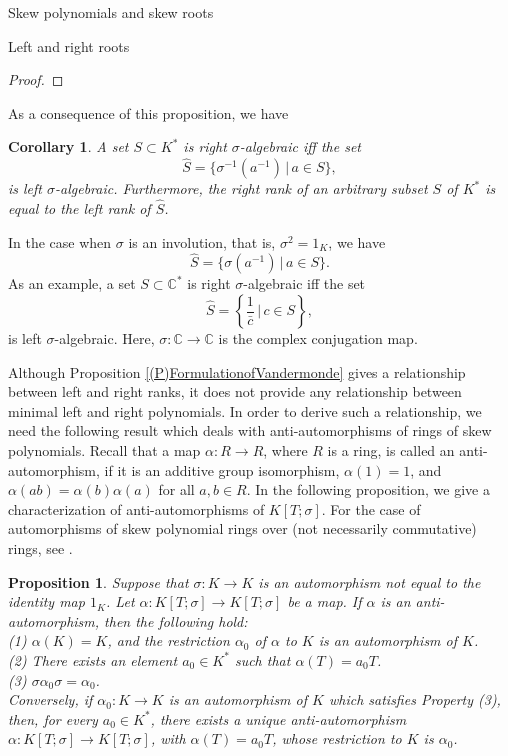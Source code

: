 \documentclass[11pt,a4paper]{article}
\theoremstyle{theorem}
\newtheorem{corollary}[theorem]{Corollary}
\newtheorem{proposition}[theorem]{Proposition}
\numberwithin{equation}{section}
\newcommand{\s}{\sigma}
\begin{document}
\begin{section}{Skew polynomials and skew roots}
\begin{subsection}{Left and right roots}
\begin{proof}
	\end{proof}
	 As a consequence of this proposition, we have
	 \begin{corollary}
	 	A set $S\subset K^*$ is right $\s$-algebraic iff the set 
	 	$$\widehat{S}=\{\s^{-1}(a^{-1})\, |\, a\in S\},$$
	 	is left $\s$-algebraic. Furthermore, the right rank of an arbitrary subset $S$ of $K^*$  is equal to the left rank of $\widehat{S}$. 
	 \end{corollary}
	In the case when $\s$ is an involution, that is, $\s^2=1_K$, we have
	$$\widehat{S}=\{\s(a^{-1})\, |\, a\in S\}.$$
	As an example, a set $S\subset \mathbb{C}^*$ is right $\s$-algebraic iff the set 
	$$\widehat{S}=\left\lbrace \frac{1}{\bar{c}}\, |\, c\in S\right\rbrace ,$$
	is left $\s$-algebraic. Here, $\s:\mathbb{C}\to \mathbb{C}$ is the complex conjugation map. 

	Although Proposition \ref{(P)FormulationofVandermonde} gives a relationship between left and right ranks, it does not provide any relationship between minimal left and right  polynomials.  In order to derive such a relationship, we need the following result which deals with anti-automorphisms of rings of skew polynomials. Recall that a map $\alpha:R\to R$, where $R$ is a ring,  is called an anti-automorphism, if it is an additive group isomorphism, $\alpha(1)=1$, and $\alpha(ab)=\alpha(b)\alpha(a)$ for all $a,b\in R$. In the following proposition, we give a characterization of anti-automorphisms of $K[T;\s]$. For the case of automorphisms of skew polynomial rings over (not necessarily commutative) rings, see \cite{chuang2013automorphisms}.  
	\begin{proposition}\label{(P)Anti-automorphism}
		Suppose that $\s:K\to K$ is an automorphism not equal to the identity map $1_K$. Let $\alpha:K[T;\s]\to K[T;\s]$ be a map. If $\alpha$ is an anti-automorphism, then the following hold:\\
		(1) $\alpha(K)= K$, and the restriction $\alpha_0$ of $\alpha$ to $K$ is an automorphism of $K$. \\
		(2) There exists an element $a_0\in K^*$ such that $\alpha(T)=a_0 T$.\\
		(3) $\s\alpha_0\s=\alpha_0$. \\
		Conversely, if $\alpha_0:K\to K$ is an automorphism of $K$ which satisfies Property (3), then, for every $a_0\in K^*$, there exists a unique anti-automorphism \newline $\alpha:K[T;\s]\to K[T;\s]$, with $\alpha(T)=a_0T$, whose restriction to $K$ is $\alpha_0$.  
		

\end{proposition}
\end{subsection}
\end{section}
\end{document}
